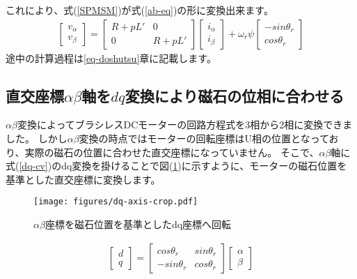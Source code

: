 これにより、式(\ref{SPMSM})が式(\ref{ab-eq})の形に変換出来ます。
{\large
\begin{align}
    \begin{bmatrix}
        v_{\alpha} \\
        v_{\beta}
    \end{bmatrix}
    =
    \begin{bmatrix}
        R+pL' & 0 \\
        0 & R+pL'
    \end{bmatrix}
    \begin{bmatrix}
        i_{\alpha} \\
        i_{\beta}
    \end{bmatrix}
    + \omega_{r}\psi
    \begin{bmatrix}
        -sin\theta_{r} \\
        cos\theta_{r}
    \end{bmatrix}
    \label{ab-eq}
\end{align}
}
途中の計算過程は\ref{eq-doshutsu}章に記載します。

\subsection{直交座標$\alpha\beta$軸を$dq$変換により磁石の位相に合わせる}
$\alpha\beta$変換によってブラシレスDCモーターの回路方程式を3相から2相に変換できました。
しかし$\alpha\beta$変換の時点ではモーターの回転座標はU相の位置となっており、実際の磁石の位置に合わせた直交座標になっていません。
そこで、$\alpha\beta$軸に式(\ref{dq-cv})のdq変換を掛けることで図(\ref{dq-axis})に示すように、モーターの磁石位置を基準とした直交座標に変換します。
\begin{figure}[htbp!]
    \begin{center}
        \texttt{[image: figures/dq-axis-crop.pdf]}
    \end{center}
    \caption{$αβ$座標を磁石位置を基準としたdq座標へ回転}
    \label{dq-axis}
\end{figure}

{\large
\begin{align}
    \begin{bmatrix}
        d \\
        q
    \end{bmatrix}
    =
    \begin{bmatrix}
        cos\theta_{r} & sin\theta_{r} \\
        -sin\theta_{r} & cos\theta_{r}
    \end{bmatrix}
    \begin{bmatrix}
        \alpha \\
        \beta
    \end{bmatrix}
    \label{dq-cv}
\end{align}
}

